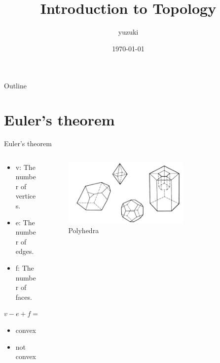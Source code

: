 \documentclass{beamer}
\title{Introduction to Topology}
\author{yuzuki}
\institute{Eyes, Japan}
\date{\today}
\begin{document}
\begin{frame}
  \titlepage
\end{frame}

\begin{frame}{Outline}
  \tableofcontents
\end{frame}


\section{Euler's theorem}

\begin{frame}{Euler's theorem}
  \begin{columns}
    \begin{column}{0.5\textwidth}
      \begin{block}{}
        \begin{itemize}
        \item v: The number of vertices.
        \item e: The number of edges.
        \item f: The number of faces.
        \end{itemize}
      \end{block}
      \begin{block}{}
        $v - e + f = 2$
      \end{block}
      \begin{block}{}
        \begin{itemize}
        \item convex
        \item not convex
        \end{itemize}
      \end{block}
    \end{column}
    \begin{column}{0.5\textwidth}
      \begin{figure}
        \centering
        \includegraphics[width=0.7\textwidth]{figure_1_1.png}
        \caption{Polyhedra}
      \end{figure}
    \end{column}
  \end{columns}
\end{frame}
\end{document}
